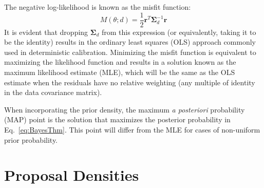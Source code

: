 The negative log-likelihood is known as the misfit function:
\begin{equation}
M(\theta;d) = \frac{1}{2} \boldsymbol{r}^T \boldsymbol{\Sigma}_d^{-1} 
\boldsymbol{r} %
\label{eq:misfit}
\end{equation}
It is evident that dropping $\boldsymbol{\Sigma}_d$ from this
expression (or equivalently, taking it to be the identity) results in
the ordinary least squares (OLS) approach commonly used in
deterministic calibration.  Minimizing the misfit function is
equivalent to maximizing the likelihood function and results in a
solution known as the maximum likelihood estimate (MLE), which will be
the same as the OLS estimate when the residuals have no relative
weighting (any multiple of identity in the data covariance matrix).

When incorporating the prior density, the maximum {\it a posteriori}
probability (MAP) point is the solution that maximizes the posterior
probability in Eq.~\ref{eq:BayesThm}.  This point will differ
from the MLE for cases of non-uniform prior probability.


\section{Proposal Densities} \label{uq:bayes:prop}

